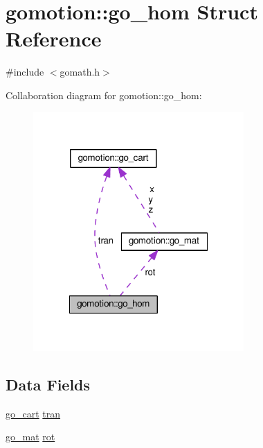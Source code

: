\hypertarget{structgomotion_1_1go__hom}{\section{gomotion\-:\-:go\-\_\-hom Struct Reference}
\label{structgomotion_1_1go__hom}
}


{\ttfamily \#include $<$gomath.\-h$>$}



Collaboration diagram for gomotion\-:\-:go\-\_\-hom\-:\nopagebreak
\begin{figure}[H]
\begin{center}
\leavevmode
\includegraphics[width=228pt]{d9/dfb/structgomotion_1_1go__hom__coll__graph}
\end{center}
\end{figure}
\subsection*{Data Fields}
\begin{DoxyCompactItemize}
\item 
\hyperlink{structgomotion_1_1go__cart}{go\-\_\-cart} \hyperlink{structgomotion_1_1go__hom_a48557aa558271478688dd08ead8a643e}{tran}
\item 
\hyperlink{structgomotion_1_1go__mat}{go\-\_\-mat} \hyperlink{structgomotion_1_1go__hom_aea63ce241414f57e48ef0fd792d576c6}{rot}
\end{DoxyCompactItemize}


